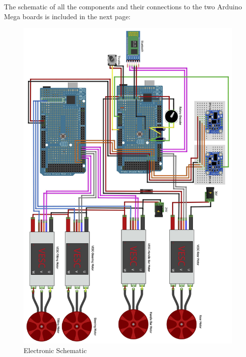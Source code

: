 The schematic of all the components and their connections to the two Arduino Mega boards is included in the next page:
\newpage
\begin{figure}[h!]
	\includegraphics[width=1\linewidth]{figs/05/PEV_fritzing2}
	\caption{Electronic Schematic}
\end{figure}

\newpage


